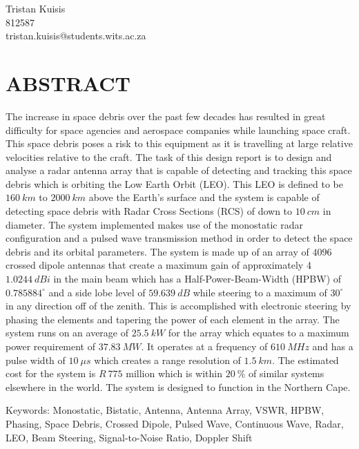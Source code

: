 \documentclass[11pt]{witseiepaper}
\begin{document}
\begin{bibunit}[witseie]
\begin{center}
\vspace{2cm}
{\Large Tristan Kuisis} \\
{\small 812587} \\
{\small tristan.kuisis@students.wits.ac.za}
\end{center}

\section*{ABSTRACT}
The increase in space debris over the past few decades has resulted in great difficulty for space agencies and aerospace companies while launching space craft. This space debris poses a risk to this equipment as it is travelling at large relative velocities relative to the craft.
The task of this design report is to design and analyse a radar antenna array that is capable of detecting and tracking this space debris which is orbiting the Low Earth Orbit (LEO). This LEO is defined to be $160~km$ to $2000~km$ above the Earth's surface and the system is capable of detecting space debris with Radar Cross Sections (RCS) of down to $10~cm$ in diameter.
The system implemented makes use of the monostatic radar configuration and a pulsed wave transmission method in order to detect the space debris and its orbital parameters.
The system is made up of an array of $4096$ crossed dipole antennas that create a maximum gain of approximately 4$1.0244~dBi$ in the main beam which has a Half-Power-Beam-Width (HPBW) of $0.785884^{\circ}$ and a side lobe level of $59.639~dB$ while steering to a maximum of $30^{\circ}$ in any direction off of the zenith. This is accomplished with electronic steering by phasing the elements and tapering the power of each element in the array.
The system runs on an average of $25.5~kW$ for the array which equates to a maximum power requirement of $37.83~MW$. It operates at a frequency of $610~MHz$ and has a pulse width of $10~\mu s$ which creates a range resolution of $1.5~km$.
The estimated cost for the system is $R~775$ million which is within $20~\%$ of similar systems elsewhere in the world. The system is designed to function in the Northern Cape.

Keywords: Monostatic, Bistatic, Antenna, Antenna Array, VSWR, HPBW, Phasing, Space Debris, Crossed Dipole, Pulsed Wave, Continuous Wave, Radar, LEO, Beam Steering, Signal-to-Noise Ratio, Doppler Shift
\clearpage


\clearpage


\end{bibunit}
\end{document}
